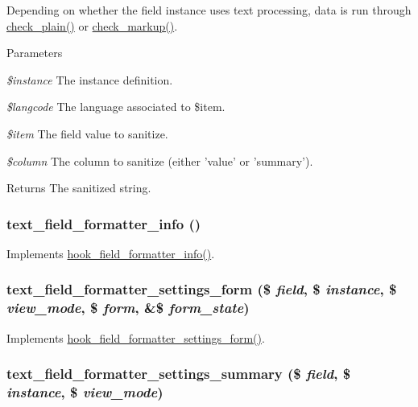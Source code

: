 Depending on whether the field instance uses text processing, data is run through \hyperlink{group__sanitization_ga76fc67a30fd8d75ddd80565e6e65a13d}{check\_\-plain()} or \hyperlink{group__sanitization_gaa3872d938cf9ba93ed0621a6b26eaa59}{check\_\-markup()}.


\begin{DoxyParams}{Parameters}
\item[{\em \$instance}]The instance definition. \item[{\em \$langcode}]The language associated to \$item. \item[{\em \$item}]The field value to sanitize. \item[{\em \$column}]The column to sanitize (either 'value' or 'summary').\end{DoxyParams}
\begin{DoxyReturn}{Returns}
The sanitized string. 
\end{DoxyReturn}
\hypertarget{text_8module_afecc893fd77d050108c8256f975831ee}{
\subsubsection[{text\_\-field\_\-formatter\_\-info}]{\setlength{\rightskip}{0pt plus 5cm}text\_\-field\_\-formatter\_\-info ()}}
\label{text_8module_afecc893fd77d050108c8256f975831ee}
Implements \hyperlink{group__field__formatter_ga2f5aa1c7455f55dffd84a48efa57f987}{hook\_\-field\_\-formatter\_\-info()}. \hypertarget{text_8module_a0eb85c2d1e0767cea7e22b00a65311a3}{
\subsubsection[{text\_\-field\_\-formatter\_\-settings\_\-form}]{\setlength{\rightskip}{0pt plus 5cm}text\_\-field\_\-formatter\_\-settings\_\-form (\$ {\em field}, \/  \$ {\em instance}, \/  \$ {\em view\_\-mode}, \/  \$ {\em form}, \/  \&\$ {\em form\_\-state})}}
\label{text_8module_a0eb85c2d1e0767cea7e22b00a65311a3}
Implements \hyperlink{group__field__types_gaf9b6aefe0b4fe6c03ebd5bd9bd1b891b}{hook\_\-field\_\-formatter\_\-settings\_\-form()}. \hypertarget{text_8module_a89eae3ac39a5f54983fa7e9f04d3ac85}{
\subsubsection[{text\_\-field\_\-formatter\_\-settings\_\-summary}]{\setlength{\rightskip}{0pt plus 5cm}text\_\-field\_\-formatter\_\-settings\_\-summary (\$ {\em field}, \/  \$ {\em instance}, \/  \$ {\em view\_\-mode})}}
